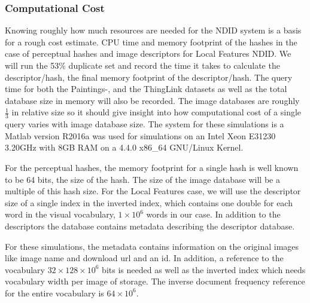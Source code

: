 \documentclass[english,12pt,a4paper,pdftex,elec,utf8, table]{aaltothesis}
\begin{document}
\subsubsection{Computational Cost}
Knowing roughly how much resources are needed for the NDID system is a basis for a rough cost estimate. CPU time and memory footprint of the hashes in the case of perceptual hashes and image descriptors for Local Features NDID. We will run the 53\% duplicate set and record the time it takes to calculate the descriptor/hash, the final memory footprint of the descriptor/hash. The query time for both the Paintings-, and the ThingLink datasets as well as the total database size in memory will also be recorded. The image databases are roughly $\frac{1}{3}$ in relative size so it should give insight into how computational cost of a single query varies with image database size. The system for these simulations is a Matlab version R2016a was used for simulations on an Intel Xeon E31230 3.20GHz with 8GB RAM on a 4.4.0 x86\_64 GNU/Linux Kernel.

For the perceptual hashes, the memory footprint for a single hash is well known to be 64 bits, the size of the hash. The size of the image database will be a multiple of this hash size. For the Local Features case, we will use the descriptor size of a single index in the inverted index, which contains one double for each word in the visual vocabulary, $1\times10^6$ words in our case. In addition to the descriptors the database contains metadata describing the descriptor database.

For these simulations, the metadata contains information on the original images like image name and download url and an id. In addition, a reference to the vocabulary $32 \times 128 \times 10^6$ bits is needed as well as the inverted index which needs vocabulary width per image of storage. The inverse document frequency reference for the entire vocabulary is $64 \times 10^6$.
\end{document}
